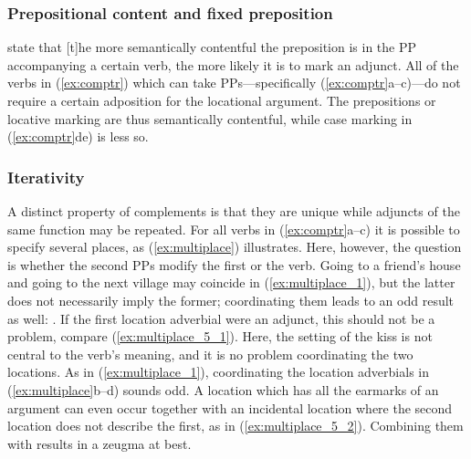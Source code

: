 \subsubsection{Prepositional content and fixed preposition}

\citet{needhamtoivonen2011} state that 
{[t]he more semantically contentful the preposition is in the PP accompanying a
certain verb, the more likely it is to mark an adjunct}. All of the verbs in
(\ref{ex:comptr}) which can take PPs---specifically (\ref{ex:comptr}a--c)---do
not require a certain adposition for the locational argument. The prepositions
or locative marking are thus semantically contentful, while case marking in
(\ref{ex:comptr}de) is less so.

\subsubsection{Iterativity}

A distinct property of complements is that they are unique while adjuncts of
the same function may be repeated. For all verbs in (\ref{ex:comptr}a--c) it is
possible to specify several places, as (\ref{ex:multiplace}) illustrates. Here,
however, the question is whether the second PPs modify the first or the verb.
Going to a friend's house and going to the next village may coincide in
(\ref{ex:multiplace_1}), but the latter does not necessarily imply the former;
coordinating them leads to an odd result as well: . If the first location adverbial were an adjunct, this
should not be a problem, compare (\ref{ex:multiplace_5_1}). Here, the setting
of the kiss is not central to the verb's meaning, and it is no problem
coordinating the two locations. As in (\ref{ex:multiplace_1}), coordinating the
location adverbials in (\ref{ex:multiplace}b–d) sounds odd. A location which
has all the earmarks of an argument can even occur together with an incidental
location where the second location does not describe the first, as in
(\ref{ex:multiplace_5_2}). Combining them with  results in a
zeugma at best.


